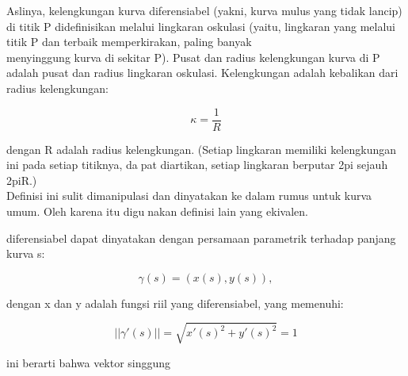 \documentclass{article}
\begin{document}
\begin{eulernotebook}
\begin{eulercomment}
\begin{eulercomment}
\begin{eulercomment}
\begin{eulercomment}
\begin{eulercomment}
\begin{eulercomment}
\begin{eulercomment}
\begin{eulercomment}
\begin{eulercomment}
\begin{eulercomment}
\begin{eulercomment}
\begin{eulercomment}
\begin{eulercomment}
\begin{eulercomment}
\begin{eulercomment}
\begin{eulercomment}
\begin{eulercomment}
\begin{eulercomment}
\begin{eulercomment}
\begin{eulercomment}
\begin{eulercomment}
Aslinya, kelengkungan kurva diferensiabel (yakni, kurva mulus yang
tidak lancip) di titik P didefinisikan melalui lingkaran oskulasi
(yaitu, lingkaran yang melalui titik P dan terbaik memperkirakan,
paling banyak\\
menyinggung kurva di sekitar P). Pusat dan radius kelengkungan kurva
di P adalah pusat dan radius lingkaran oskulasi. Kelengkungan adalah
kebalikan dari radius kelengkungan:


\end{eulercomment}
\begin{eulerformula}
\[
\kappa = \frac{1}{R}
\]
\end{eulerformula}
\begin{eulercomment}
dengan R adalah radius kelengkungan. (Setiap lingkaran memiliki
kelengkungan ini pada setiap titiknya, dapat diartikan, setiap
lingkaran berputar 2pi sejauh 2piR.)\\
Definisi ini sulit dimanipulasi dan dinyatakan ke dalam rumus untuk
kurva umum. Oleh karena itu digunakan definisi lain yang ekivalen.

\begin{eulercomment}
\begin{eulercomment}
diferensiabel dapat dinyatakan dengan persamaan parametrik terhadap
panjang kurva s:

\end{eulercomment}
\begin{eulerformula}
\[
\gamma(s)=(x(s),y(s)),
\]
\end{eulerformula}
\begin{eulercomment}
dengan x dan y adalah fungsi riil yang diferensiabel, yang memenuhi:

\end{eulercomment}
\begin{eulerformula}
\[
||\gamma'(s)||=\sqrt{x'(s)^2+y'(s)^2}=1
\]
\end{eulerformula}
\begin{eulercomment}
ini berarti bahwa vektor singgung


\end{eulercomment}
\end{eulercomment}
\end{eulercomment}
\end{eulercomment}
\end{eulercomment}
\end{eulercomment}
\end{eulercomment}
\end{eulercomment}
\end{eulercomment}
\end{eulercomment}
\end{eulercomment}
\end{eulercomment}
\end{eulercomment}
\end{eulercomment}
\end{eulercomment}
\end{eulercomment}
\end{eulercomment}
\end{eulercomment}
\end{eulercomment}
\end{eulercomment}
\end{eulercomment}
\end{eulercomment}
\end{eulercomment}
\end{eulernotebook}
\end{document}
